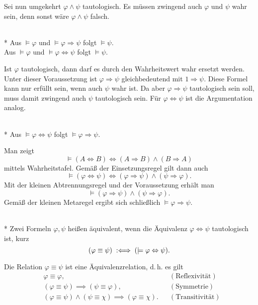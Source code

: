 Sei nun umgekehrt $\varphi\land\psi$ tautologisch. Es müssen
zwingend auch $\varphi$ und $\psi$ wahr sein, denn sonst wäre
$\varphi\land\psi$ falsch.\;\qedsymbol

\begin{Satz}\mbox{}\\*
Aus $\models\varphi$ und $\models\varphi\Rightarrow\psi$
folgt $\models\psi$.\\
Aus $\models\varphi$ und $\models\varphi\Leftrightarrow\psi$
folgt $\models\psi$.
\end{Satz}
Ist $\varphi$ tautologisch, dann darf es durch den Wahrheitswert
wahr ersetzt werden. Unter dieser Voraussetzung ist
$\varphi\Rightarrow\psi$ gleichbedeutend mit $1\Rightarrow\psi$.
Diese Formel kann nur erfüllt sein, wenn auch $\psi$ wahr ist.
Da aber $\varphi\Rightarrow\psi$ tautologisch sein soll,
muss damit zwingend auch $\psi$ tautologisch sein.
Für $\varphi\Leftrightarrow\psi$ ist die Argumentation
analog.\;\qedsymbol

\begin{Satz}\mbox{}\\*
Aus $\models\varphi\Leftrightarrow\psi$
folgt $\models\varphi\Rightarrow\psi$.
\end{Satz}
Man zeigt
\[\models (A\Leftrightarrow B)
\Leftrightarrow (A\Rightarrow B)\land (B\Rightarrow A)\]
mittels Wahrheitstafel. Gemäß der Einsetzungsregel gilt dann auch
\[\models (\varphi\Leftrightarrow\psi)
\Leftrightarrow (\varphi\Rightarrow\psi)\land (\psi\Rightarrow\varphi).\]
Mit der kleinen Abtrennungsregel und der Voraussetzung erhält man
\[\models (\varphi\Rightarrow\psi)\land (\psi\Rightarrow\varphi).\]
Gemäß der kleinen Metaregel ergibt sich schließlich
$\models \varphi\Rightarrow\psi$.\;\qedsymbol

\newpage
\begin{Definition}\mbox{}\\*
Zwei Formeln $\varphi,\psi$ heißen äquivalent, wenn die
Äquivalenz $\varphi\Leftrightarrow\psi$ tautologisch ist, kurz
\[(\varphi\equiv\psi)\;:\Longleftrightarrow\;(\models\varphi\Leftrightarrow\psi).\]
\end{Definition}

\begin{Satz}
Die Relation $\varphi\equiv\psi$ ist eine Äquivalenzrelation, d.\,h.
es gilt
\begin{align}
& \varphi\equiv\varphi, && (\text{Reflexivität})\\
& (\varphi\equiv\psi)\implies (\psi\equiv\varphi), && (\text{Symmetrie})\\
& (\varphi\equiv\psi)\land (\psi\equiv\chi)\implies (\varphi\equiv\chi). && (\text{Transitivität})
\end{align}
\end{Satz}

